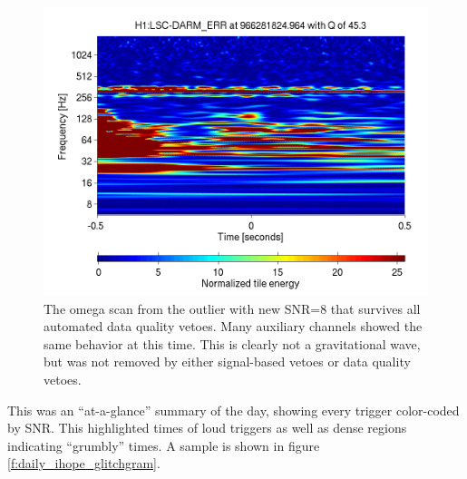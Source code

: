 \begin{figure}
  \includegraphics[width=\linewidth]{figures/detchar/966281824_963867187_H1_LSC-DARM_ERR_1_00_spectrogram_whitened}
  \caption[Omega scan of the loudest new SNR trigger]{
  \label{f:daily_loudest_glitch}
The omega scan from the outlier with new SNR=8 that survives all
automated data quality vetoes.  Many auxiliary channels showed the
same behavior at this time.  This is clearly not a gravitational wave,
but was not removed by either signal-based vetoes or data quality
vetoes.}
\end{figure}%



This was an ``at-a-glance'' summary of the day, showing every trigger
color-coded by SNR.  This highlighted times of loud triggers as well
as dense regions indicating ``grumbly'' times.  A sample is shown in
figure \ref{f:daily_ihope_glitchgram}.

